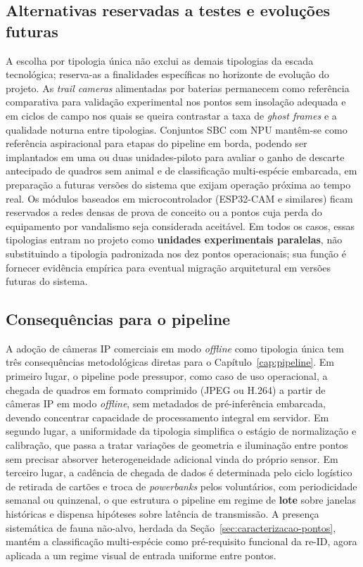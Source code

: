 \subsection*{Alternativas reservadas a testes e evoluções futuras}

A escolha por tipologia única não exclui as demais tipologias da escada tecnológica; reserva-as a finalidades específicas no horizonte de evolução do projeto. As \emph{trail cameras} alimentadas por baterias permanecem como referência comparativa para validação experimental nos pontos sem insolação adequada e em ciclos de campo nos quais se queira contrastar a taxa de \emph{ghost frames} e a qualidade noturna entre tipologias. Conjuntos SBC com NPU mantêm-se como referência aspiracional para etapas do pipeline em borda, podendo ser implantados em uma ou duas unidades-piloto para avaliar o ganho de descarte antecipado de quadros sem animal e de classificação multi-espécie embarcada, em preparação a futuras versões do sistema que exijam operação próxima ao tempo real. Os módulos baseados em microcontrolador (ESP32-CAM e similares) ficam reservados a redes densas de prova de conceito ou a pontos cuja perda do equipamento por vandalismo seja considerada aceitável. Em todos os casos, essas tipologias entram no projeto como \textbf{unidades experimentais paralelas}, não substituindo a tipologia padronizada nos dez pontos operacionais; sua função é fornecer evidência empírica para eventual migração arquitetural em versões futuras do sistema.

\subsection*{Consequências para o pipeline}

A adoção de câmeras IP comerciais em modo \emph{offline} como tipologia única tem três consequências metodológicas diretas para o Capítulo~\ref{cap:pipeline}. Em primeiro lugar, o pipeline pode pressupor, como caso de uso operacional, a chegada de quadros em formato comprimido (JPEG ou H.264) a partir de câmeras IP em modo \emph{offline}, sem metadados de pré-inferência embarcada, devendo concentrar capacidade de processamento integral em servidor. Em segundo lugar, a uniformidade da tipologia simplifica o estágio de normalização e calibração, que passa a tratar variações de geometria e iluminação entre pontos sem precisar absorver heterogeneidade adicional vinda do próprio sensor. Em terceiro lugar, a cadência de chegada de dados é determinada pelo ciclo logístico de retirada de cartões e troca de \emph{powerbanks} pelos voluntários, com periodicidade semanal ou quinzenal, o que estrutura o pipeline em regime de \textbf{lote} sobre janelas históricas e dispensa hipóteses sobre latência de transmissão. A presença sistemática de fauna não-alvo, herdada da Seção~\ref{sec:caracterizacao-pontos}, mantém a classificação multi-espécie como pré-requisito funcional da re-ID, agora aplicada a um regime visual de entrada uniforme entre pontos.

